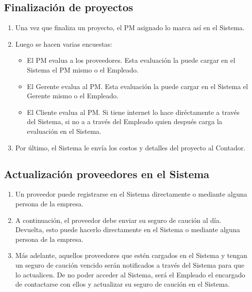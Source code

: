 \subsection{Finalización de proyectos}
\begin{enumerate}
    \item Una vez que finaliza un proyecto, el PM asignado lo marca así en el Sistema.
    \item Luego se hacen varias encuestas:
        \begin{itemize}
            \item El PM evalua a los proveedores. Esta evaluación la puede cargar en el Sistema el PM mismo o el Empleado.
            \item El Gerente evalua al PM. Esta evaluación la puede cargar en el Sistema el Gerente mismo o el Empleado.
            \item El Cliente evalua al PM. Si tiene internet lo hace diréctamente a través del Sistema, si no a a través del Empleado quien después carga la evaluación en el Sistema.
        \end{itemize}
      \item Por último, el Sistema le envía los costos y detalles del proyecto al Contador.
\end{enumerate}

\subsection{Actualización proveedores en el Sistema}
\begin{enumerate}
    \item Un proveedor puede registrarse en el Sistema directamente o mediante alguna persona de la empresa.
    \item A continuación, el proveedor debe enviar su seguro de caución al día. Devuelta, esto puede hacerlo directamente en el Sistema o mediante alguna persona de la empresa.
    \item Más adelante, aquellos proveedores que estén cargados en el Sistema y tengan un seguro de caución vencido serán notificados a través del Sistema para que lo actualicen.
      De no poder acceder al Sistema, será el Empleado el encargado de contactarse con ellos y actualizar su seguro de caución en el Sistema.
\end{enumerate}
